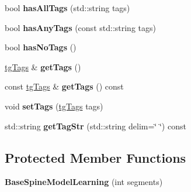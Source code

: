 \begin{DoxyCompactItemize}
\item 
\hypertarget{classtg_taggable_a33b77b1075171b63f673965687b2e844}{bool {\bfseries has\-All\-Tags} (std\-::string tags)}\label{classtg_taggable_a33b77b1075171b63f673965687b2e844}

\item 
\hypertarget{classtg_taggable_af14af28fa98021c4f20a5e8f2ddd5606}{bool {\bfseries has\-Any\-Tags} (const std\-::string tags)}\label{classtg_taggable_af14af28fa98021c4f20a5e8f2ddd5606}

\item 
\hypertarget{classtg_taggable_adff345e116e16420c701a748ff8f995f}{bool {\bfseries has\-No\-Tags} ()}\label{classtg_taggable_adff345e116e16420c701a748ff8f995f}

\item 
\hypertarget{classtg_taggable_acf1d7fa9df8f374f25015c4080902681}{\hyperlink{classtg_tags}{tg\-Tags} \& {\bfseries get\-Tags} ()}\label{classtg_taggable_acf1d7fa9df8f374f25015c4080902681}

\item 
\hypertarget{classtg_taggable_ae70d7d3b45301665bc363b0ed8b9b292}{const \hyperlink{classtg_tags}{tg\-Tags} \& {\bfseries get\-Tags} () const }\label{classtg_taggable_ae70d7d3b45301665bc363b0ed8b9b292}

\item 
\hypertarget{classtg_taggable_a5492888e4e4da4cca6261070b5726adf}{void {\bfseries set\-Tags} (\hyperlink{classtg_tags}{tg\-Tags} tags)}\label{classtg_taggable_a5492888e4e4da4cca6261070b5726adf}

\item 
\hypertarget{classtg_taggable_a346d66b066d2d9eb1eadba01da43749f}{std\-::string {\bfseries get\-Tag\-Str} (std\-::string delim=\char`\"{} \char`\"{}) const }\label{classtg_taggable_a346d66b066d2d9eb1eadba01da43749f}

\end{DoxyCompactItemize}
\subsection*{Protected Member Functions}
\begin{DoxyCompactItemize}
\item 
\hypertarget{class_base_spine_model_learning_a666bf86f666e0830c6b2da7f5176e750}{{\bfseries Base\-Spine\-Model\-Learning} (int segments)}\label{class_base_spine_model_learning_a666bf86f666e0830c6b2da7f5176e750}

\end{DoxyCompactItemize}
